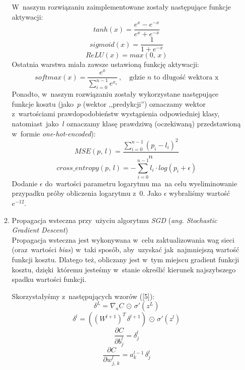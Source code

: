 \documentclass[11pt, a4paper]{article}
\begin{document}
\begin{enumerate}
\begin{enumerate}
        W~naszym rozwiązaniu zaimplementowane zostały następujące funkcje aktywacji:
        \begin{equation}
            tanh(x) = \frac{e^x - e^{-x}}{e^x + e^{-x}}
        \end{equation}
        \begin{equation}
            sigmoid(x) = \frac{1}{1 + e^{-x}}
        \end{equation}
        \begin{equation}
            ReLU(x) = max(0, \, x)
        \end{equation}
        Ostatnia warstwa miała zawsze ustawioną funkcję aktywacji:
        \begin{equation}
            softmax(x) = \frac{e^x}{\sum_{i = 0}^{n - 1} e^{x_i}}\, , \quad \text{gdzie $n$ to długość wektora x}
        \end{equation}
        Ponadto, w~naszym rozwiązaniu zostały wykorzystane następujące funkcje kosztu (jako~$p$ (wektor ,,predykcji'') oznaczamy wektor z~wartościami prawdopodobieństw wystąpienia odpowiedniej klasy, natomiast~jako~$l$ oznaczamy klasę prawdziwą (oczekiwaną) przedstawioną w~formie \textit{one-hot-encoded}):
        \begin{equation}
            MSE(p,\, l) = \frac{\sum_{i=0}^{n-1} (p_i - l_i)^2}{n}
        \end{equation}
        \begin{equation}
            cross\_entropy(p, \, l) = -\sum_{i=0}^{n-1} l_i \cdot log(p_i + \epsilon)
        \end{equation}
        Dodanie $\epsilon$ do~wartości parametru logarytmu ma~na celu wyeliminowanie przypadku próby obliczenia logarytmu z~$0$. Jako $\epsilon$ wybraliśmy wartość $e^{-12}$. 
        
        \item Propagacja wsteczna przy~użyciu algorytmu \textit{SGD} (\textit{ang. Stochastic Gradient Descent}) \\
        Propagacja wsteczna jest wykonywana w~celu zaktualizowania wag sieci (oraz~wartości \textit{bias}) w~taki sposób, aby~uzyskać jak~najmniejszą wartość funkcji kosztu. Dlatego też, obliczany jest w~tym miejscu gradient funkcji kosztu, dzięki~któremu jesteśmy w~stanie określić kierunek najszybszego spadku wartości funkcji.
        
        Skorzystałyśmy z~następujących wzorów ([5]):
        \begin{equation}
            \delta^L = \nabla_a C \, \odot \, \sigma'(z^L)
        \end{equation}
        \begin{equation}
            \delta^l = ((W^{l+1})^T \, \delta^{l+1}) \, \odot \, \sigma'(z^l)
        \end{equation}
        \begin{equation}
            \frac{\partial C}{\partial b^l_j} = \delta_j^l
        \end{equation}
        \begin{equation}
            \frac{\partial C}{\partial w^l_{j,\,k}} = a_k^{l-1} \, \delta_j^l
        \end{equation}
        

\end{enumerate}
\end{enumerate}
\end{document}
